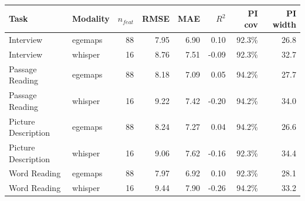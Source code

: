 \begin{tabular}{llrrrrrr}
\toprule
Task & Modality & $n_{feat}$ & RMSE & MAE & $R^2$ & PI cov & PI width \\
\midrule
Interview & egemaps & 88 & 7.95 & 6.90 & 0.10 & 92.3\% & 26.8 \\
Interview & whisper & 16 & 8.76 & 7.51 & -0.09 & 92.3\% & 32.7 \\
Passage Reading & egemaps & 88 & 8.18 & 7.09 & 0.05 & 94.2\% & 27.7 \\
Passage Reading & whisper & 16 & 9.22 & 7.42 & -0.20 & 94.2\% & 34.0 \\
Picture Description & egemaps & 88 & 8.24 & 7.27 & 0.04 & 94.2\% & 26.6 \\
Picture Description & whisper & 16 & 9.06 & 7.62 & -0.16 & 92.3\% & 34.4 \\
Word Reading & egemaps & 88 & 7.97 & 6.92 & 0.10 & 92.3\% & 28.1 \\
Word Reading & whisper & 16 & 9.44 & 7.90 & -0.26 & 94.2\% & 33.2 \\
\bottomrule
\end{tabular}
